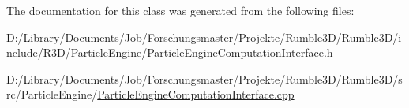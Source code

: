 The documentation for this class was generated from the following files\+:\begin{DoxyCompactItemize}
\item 
D\+:/\+Library/\+Documents/\+Job/\+Forschungsmaster/\+Projekte/\+Rumble3\+D/\+Rumble3\+D/include/\+R3\+D/\+Particle\+Engine/\mbox{\hyperlink{_particle_engine_computation_interface_8h}{Particle\+Engine\+Computation\+Interface.\+h}}\item 
D\+:/\+Library/\+Documents/\+Job/\+Forschungsmaster/\+Projekte/\+Rumble3\+D/\+Rumble3\+D/src/\+Particle\+Engine/\mbox{\hyperlink{_particle_engine_computation_interface_8cpp}{Particle\+Engine\+Computation\+Interface.\+cpp}}\end{DoxyCompactItemize}
